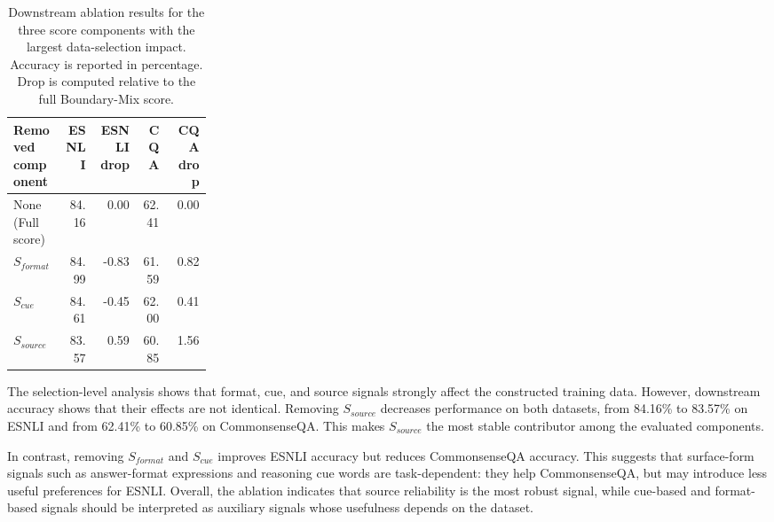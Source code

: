 \begin{table}[H]
\centering
\caption{Downstream ablation results for the three score components with the largest data-selection impact. Accuracy is reported in percentage. Drop is computed relative to the full Boundary-Mix score.}
\label{tab:score-component-downstream-ablation}
\begin{tabular}{p{0.26\linewidth} r r r r}
\hline
Removed component & ESNLI & ESNLI drop & CQA & CQA drop \\
\hline
None (Full score) & 84.16 & 0.00 & 62.41 & 0.00 \\
\hline
$S_{format}$ & 84.99 & -0.83 & 61.59 & 0.82 \\
$S_{cue}$ & 84.61 & -0.45 & 62.00 & 0.41 \\
$S_{source}$ & 83.57 & 0.59 & 60.85 & 1.56 \\
\hline
\end{tabular}
\end{table}

The selection-level analysis shows that format, cue, and source signals strongly affect the constructed training data. However, downstream accuracy shows that their effects are not identical. Removing $S_{source}$ decreases performance on both datasets, from 84.16\% to 83.57\% on ESNLI and from 62.41\% to 60.85\% on CommonsenseQA. This makes $S_{source}$ the most stable contributor among the evaluated components.

In contrast, removing $S_{format}$ and $S_{cue}$ improves ESNLI accuracy but reduces CommonsenseQA accuracy. This suggests that surface-form signals such as answer-format expressions and reasoning cue words are task-dependent: they help CommonsenseQA, but may introduce less useful preferences for ESNLI. Overall, the ablation indicates that source reliability is the most robust signal, while cue-based and format-based signals should be interpreted as auxiliary signals whose usefulness depends on the dataset.
